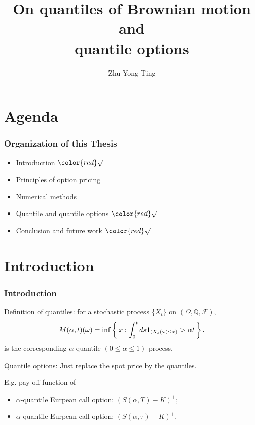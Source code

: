 \documentclass[cjk]{beamer}
\begin{document}
\title{On quantiles of Brownian motion and \\
quantile options}
\author{Zhu Yong Ting}
\date{} \frame{\titlepage}

\section{Agenda}
\begin{frame}
\frametitle{Organization of this Thesis}

\begin{itemize}
\item Introduction  $\color{red}\surd$
\item Principles of option pricing 
\item Numerical methods
\item Quantile and quantile options $\color{red}\surd$
\item Conclusion and future work $\color{red}\surd$
\end{itemize}
\end{frame}

\section{Introduction} 
\begin{frame}
\frametitle{Introduction}
Definition of quantiles:
for a stochastic process \{$X_t$\} on $(\Omega, \mathbb Q, \mathcal F)$, \\
\[
M(\alpha,t)(\omega) = \inf\Set{x:\int_0^t ds1_{(X_s (\omega)\leq x)} > \alpha t}.
\]
is the corresponding $\alpha$-quantile $(0 \leq \alpha \leq 1)$ process.
\vspace{1em}

Quantile options:
Just replace the spot price by the quantiles.

E.g. pay off function of 
\begin{itemize}
\item 
$\alpha$-quantile Eurpean call option: $(S(\alpha,T)-K)^+$;
\item 
$\alpha$-quantile Eurpean call option: $(S(\alpha,\tau)-K)^+$.
\end{itemize}
\end{frame}
\end{document}
